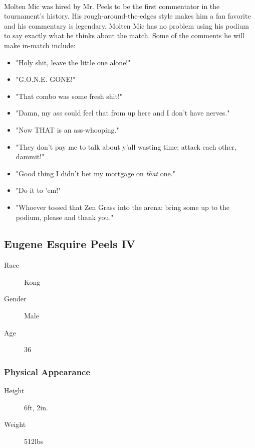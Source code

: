 \paragraph{} Molten Mic was hired by Mr. Peels to be the first commentator in the tournament's history. His rough-around-the-edges style makes him a fan favorite and his commentary is legendary. Molten Mic has no problem using his podium to say exactly what he thinks about the match. Some of the comments he will make in-match include:

\begin{itemize}
    \item "Holy shit, leave the little one alone!"
    \item "G.O.N.E. GONE!"
    \item "That combo was some fresh shit!"
    \item "Damn, my ass could feel that from up here and I don't have nerves."
    \item "Now THAT is an ass-whooping."
    \item "They don't pay me to talk about y'all wasting time; attack each other, dammit!"
    \item "Good thing I didn't bet my mortgage on \textit{that} one."
    \item "Do it to 'em!"
    \item "Whoever tossed that Zen Grass into the arena: bring some up to the podium, please and thank you."
\end{itemize}

\subsection{Eugene Esquire Peels IV}

\begin{description}
    \item[Race] Kong
    \item[Gender] Male
    \item[Age] 36  
\end{description}

\subsubsection{Physical Appearance}

\begin{description}
    \item[Height] 6ft, 2in.
    \item[Weight] 512lbs
\end{description}

